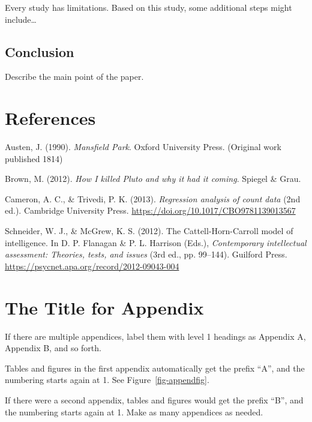 \documentclass[
  jou,
  floatsintext,
  longtable,
  nolmodern,
  notxfonts,
  notimes,
  colorlinks=true,linkcolor=blue,citecolor=blue,urlcolor=blue]{apa7}
\newlength{\cslhangindent}
\newenvironment{CSLReferences}[2] %
 {\begin{list}{}{%
  \setlength{\itemindent}{0pt}
  \setlength{\leftmargin}{0pt}
  \setlength{\parsep}{0pt}
  \ifodd #1
   \setlength{\leftmargin}{\cslhangindent}
   \setlength{\itemindent}{-1\cslhangindent}
  \fi
  \setlength{\itemsep}{#2\baselineskip}}}
 {\end{list}}
\begin{document}
Every study has limitations. Based on this study, some additional steps
might include\ldots{}

\subsection{Conclusion}\label{conclusion}

Describe the main point of the paper.

\section{References}\label{references}

\label{refs}
\begin{CSLReferences}{1}{0}
Austen, J. (1990). \emph{Mansfield {P}ark}. Oxford University Press.
(Original work published 1814)

Brown, M. (2012). \emph{How {I} killed {Pluto} and why it had it
coming}. Spiegel \& Grau.

Cameron, A. C., \& Trivedi, P. K. (2013). \emph{Regression analysis of
count data} (2nd ed.). Cambridge University Press.
\url{https://doi.org/10.1017/CBO9781139013567}

Schneider, W. J., \& McGrew, K. S. (2012). The {Cattell-Horn-Carroll}
model of intelligence. In D. P. Flanagan \& P. L. Harrison (Eds.),
\emph{Contemporary intellectual assessment: {Theories}, tests, and
issues} (3rd ed., pp. 99--144). Guilford Press.
\url{https://psycnet.apa.org/record/2012-09043-004}

\end{CSLReferences}

\appendix

\section{The Title for Appendix}\label{the-title-for-appendix}

If there are multiple appendices, label them with level 1 headings as
Appendix A, Appendix B, and so forth.

Tables and figures in the first appendix automatically get the prefix
``A'', and the numbering starts again at 1. See
Figure~\ref{fig-appendfig}.

If there were a second appendix, tables and figures would get the prefix
``B'', and the numbering starts again at 1. Make as many appendices as
needed.
\end{document}
